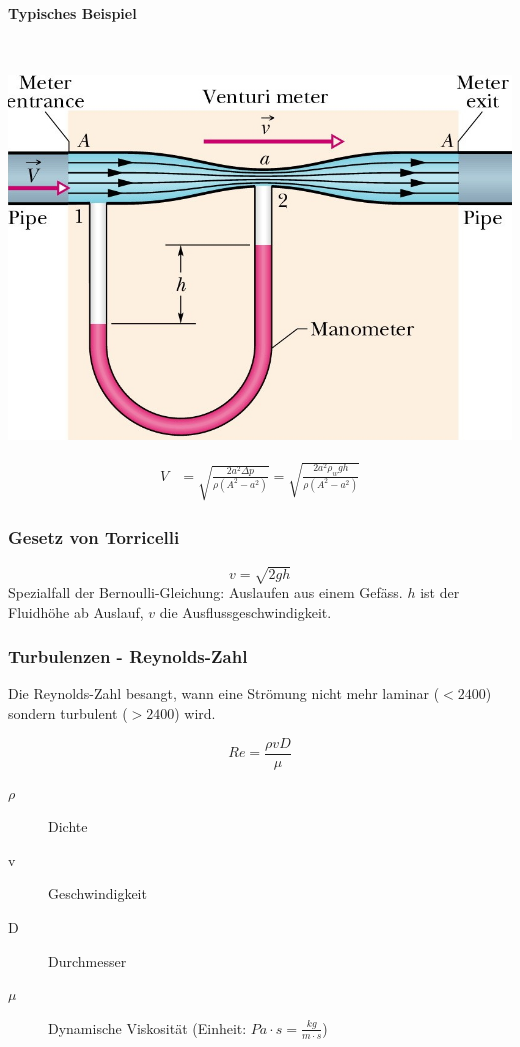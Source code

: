 \documentclass[a4paper]{scrartcl}
\begin{document}
	\paragraph{Typisches Beispiel} \hfill \\
	\begin{multicols}{2}[]
		\includegraphics[width=\linewidth]{img/bernoulli}
		
		\begin{align*}
			V &= \sqrt{\frac{2a^2 \Delta p}{\rho (A^2 - a^2)}} = \sqrt{\frac{2 a^2 \rho_w g h}{\rho (A^2 - a^2)}}
		\end{align*}
	\end{multicols}


\subsubsection{Gesetz von Torricelli}
	\[
		v = \sqrt{2gh}
	\]
	Spezialfall der Bernoulli-Gleichung: Auslaufen aus einem Gefäss. $h$ ist der Fluidhöhe ab Auslauf, $v$ die Ausflussgeschwindigkeit.
	

\subsubsection{Turbulenzen - Reynolds-Zahl}
	Die Reynolds-Zahl besangt, wann eine Strömung nicht mehr laminar ($<2400$) sondern turbulent ($>2400$) wird.
	
	\[
		Re = \frac{\rho v D}{\mu}
	\]

	\begin{description}
		\item[$\rho$] Dichte
		\item[v] Geschwindigkeit
		\item[D] Durchmesser
		\item[$\mu$] Dynamische Viskosität (Einheit: $Pa \cdot s = \frac{kg}{m \cdot s}$)
	\end{description}
\end{document}
